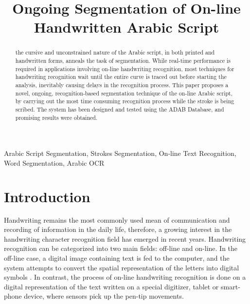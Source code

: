 \documentclass[10pt, conference, compsocconf]{IEEEtran}
\begin{document}
\title{Ongoing Segmentation of On-line Handwritten Arabic Script}

\author{
\and
{}
}
\maketitle

\begin{abstract}
the cursive and unconstrained nature of the Arabic script, in both printed and handwritten forms, anneals the task of segmentation. 
While real-time performance is required in applications involving on-line handwriting recognition, most techniques for handwriting recognition wait until the entire curve is traced out before starting the analysis, inevitably causing delays in the recognition process. 
This paper proposes a novel, ongoing, recognition-based segmentation technique of the on-line Arabic script, by carrying out the most time consuming recognition process while the stroke is being scribed. 
The system has been designed and tested using the ADAB Database, and promising results were obtained.
\end{abstract}

\begin{IEEEkeywords}
Arabic Script Segmentation, Strokes Segmentation, On-line Text Recognition, Word Segmentation, Arabic OCR
\end{IEEEkeywords}


\section{Introduction}
Handwriting remains the most commonly used mean of communication and recording of information in the daily life, therefore, a growing interest in the handwriting character recognition field has emerged in recent years. 
Handwriting recognition can be categorized into two main fields: off-line and on-line. 
In the off-line case, a digital image containing text is fed to the computer, and the system attempts to convert the spatial representation of the letters into digital symbols \cite{al2011online}. 
In contrast, the process of on-line handwriting recognition is done on a digital representation of the text written on a special digitizer, tablet or smart-phone device, where sensors pick up the pen-tip movements.\\
 
\end{document}
